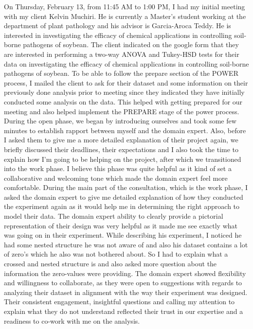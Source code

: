 \documentclass[
  10pt,
  letterpaper,
  twocolumn]{article}
\begin{document}
On Thursday, February 13, from 11:45 AM to 1:00 PM, I had my initial
meeting with my client Kelvin Muchiri. He is currently a Master's
student working at the department of plant pathology and his advisor is
Garcia-Aroca Teddy. He is interested in investigating the efficacy of
chemical applications in controlling soil-borne pathogens of soybean.
The client indicated on the google form that they are interested in
performing a two-way ANOVA and Tukey-HSD tests for their data on
investigating the efficacy of chemical applications in controlling
soil-borne pathogens of soybean. To be able to follow the prepare
section of the POWER process, I mailed the client to ask for their
dataset and some information on their previously done analysis prior to
meeting since they indicated they have initially conducted some analysis
on the data. This helped with getting prepared for our meeting and also
helped implement the PREPARE stage of the power process. During the open
phase, we began by introducing ourselves and took some few minutes to
establish rapport between myself and the domain expert. Also, before I
asked them to give me a more detailed explanation of their project
again, we briefly discussed their deadlines, their expectations and I
also took the time to explain how I'm going to be helping on the
project, after which we transitioned into the work phase. I believe this
phase was quite helpful as it kind of set a collaborative and welcoming
tone which made the domain expert feel more comfortable. During the main
part of the consultation, which is the work phase, I asked the domain
expert to give me detailed explanation of how they conducted the
experiment again as it would help me in determining the right approach
to model their data. The domain expert ability to clearly provide a
pictorial representation of their design was very helpful as it made me
see exactly what was going on in their experiment. While describing his
experiment, I noticed he had some nested structure he was not aware of
and also his dataset contains a lot of zero's which he also was not
bothered about. So I had to explain what a crossed and nested structure
is and also asked more question about the information the zero-values
were providing. The domain expert showed flexibility and willingness to
collaborate, as they were open to suggestions with regards to analyzing
their dataset in alignment with the way their experiment was designed.
Their consistent engagement, insightful questions and calling my
attention to explain what they do not understand reflected their trust
in our expertise and a readiness to co-work with me on the analysis.
\end{document}
